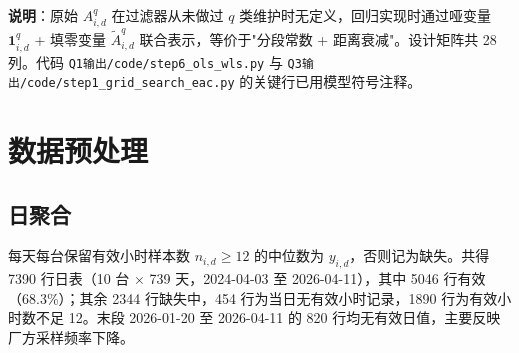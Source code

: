 \documentclass[12pt, a4paper, fontset=fandol]{ctexart}
\theoremstyle{definition}
\begin{document}
\begin{table}[H]
\centering
\caption{模型符号 $\leftrightarrow$ 代码变量对照}
\end{table}

\textbf{说明}：原始 $A_{i,d}^q$ 在过滤器从未做过 $q$ 类维护时无定义，回归实现时通过哑变量 $\mathbf{1}_{i,d}^q$ + 填零变量 $\tilde{A}_{i,d}^q$ 联合表示，等价于"分段常数 + 距离衰减"。设计矩阵共 28 列。代码 \texttt{Q1输出/code/step6\_ols\_wls.py} 与 \texttt{Q3输出/code/step1\_grid\_search\_eac.py} 的关键行已用模型符号注释。

\section{数据预处理}

\subsection{日聚合}
每天每台保留有效小时样本数 $n_{i,d} \ge 12$ 的中位数为 $y_{i,d}$，否则记为缺失。共得 7390 行日表（10 台 $\times$ 739 天，2024-04-03 至 2026-04-11），其中 5046 行有效（68.3\%）；其余 2344 行缺失中，454 行为当日无有效小时记录，1890 行为有效小时数不足 12。末段 2026-01-20 至 2026-04-11 的 820 行均无有效日值，主要反映厂方采样频率下降。
\end{document}
